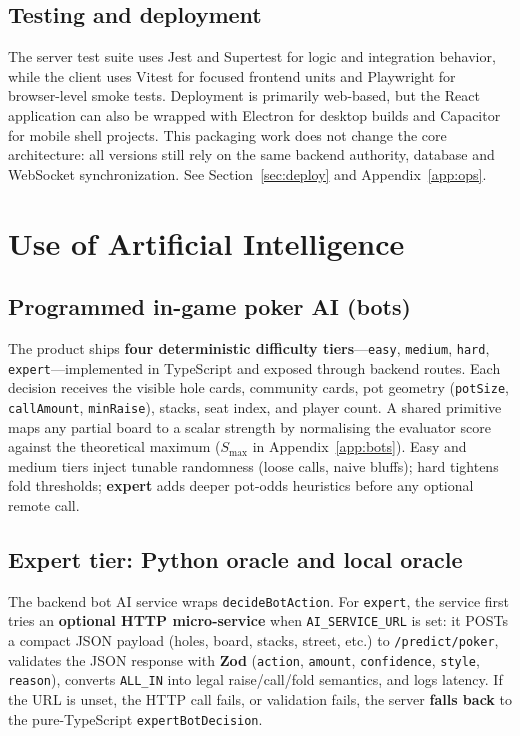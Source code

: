\documentclass[11pt,a4paper]{article}
\begin{document}
\subsection{Testing and deployment}

The server test suite uses Jest and Supertest for logic and integration behavior, while the client uses Vitest for focused frontend units and Playwright for browser-level smoke tests. Deployment is primarily web-based, but the React application can also be wrapped with Electron for desktop builds and Capacitor for mobile shell projects. This packaging work does not change the core architecture: all versions still rely on the same backend authority, database and WebSocket synchronization. See Section~\ref{sec:deploy} and Appendix~\ref{app:ops}.

\section{Use of Artificial Intelligence}
\label{sec:ai}

\subsection{Programmed in-game poker AI (bots)}

The product ships \textbf{four deterministic difficulty tiers}---\texttt{easy}, \texttt{medium}, \texttt{hard}, \texttt{expert}---implemented in TypeScript and exposed through backend routes. Each decision receives the visible hole cards, community cards, pot geometry (\texttt{potSize}, \texttt{callAmount}, \texttt{minRaise}), stacks, seat index, and player count. A shared primitive maps any partial board to a scalar strength by normalising the evaluator score against the theoretical maximum ($S_{\max}$ in Appendix~\ref{app:bots}). Easy and medium tiers inject tunable randomness (loose calls, naive bluffs); hard tightens fold thresholds; \textbf{expert} adds deeper pot-odds heuristics before any optional remote call.

\subsection{Expert tier: Python oracle and local oracle}

The backend bot AI service wraps \texttt{decideBotAction}. For \texttt{expert}, the service first tries an \textbf{optional HTTP micro-service} when \texttt{AI\_SERVICE\_URL} is set: it POSTs a compact JSON payload (holes, board, stacks, street, etc.) to \texttt{/predict/poker}, validates the JSON response with \textbf{Zod} (\texttt{action}, \texttt{amount}, \texttt{confidence}, \texttt{style}, \texttt{reason}), converts \texttt{ALL\_IN} into legal raise/call/fold semantics, and logs latency. If the URL is unset, the HTTP call fails, or validation fails, the server \textbf{falls back} to the pure-TypeScript \texttt{expertBotDecision}.
\end{document}
